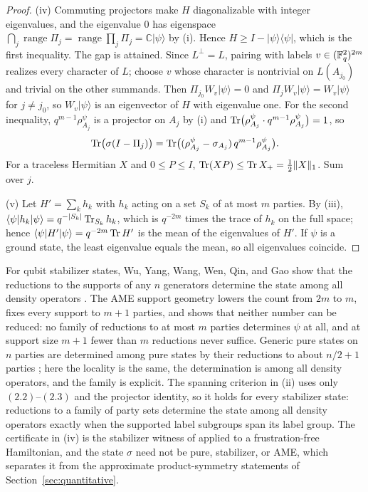 \begin{proof}
(iv) Commuting projectors make \(H\) diagonalizable with integer
eigenvalues, and the eigenvalue \(0\) has eigenspace
\(\bigcap_j\operatorname{range}\Pi_j=\operatorname{range}\prod_j\Pi_j
 =\mathbb C\lvert\psi\rangle\) by (i).  Hence
\(H\geq I-\lvert\psi\rangle\langle\psi\rvert\), which is the first
inequality.  The gap is attained.  Since \(L^\perp=L\), pairing with
labels \(v\in(\mathbb F_q^2)^{2m}\) realizes every character of \(L\); choose
\(v\) whose character is nontrivial on \(L(A_{j_0})\) and trivial on the
other summands.  Then \(\Pi_{j_0}W_v\lvert\psi\rangle=0\) and
\(\Pi_jW_v\lvert\psi\rangle=W_v\lvert\psi\rangle\) for \(j\neq j_0\), so
\(W_v\lvert\psi\rangle\) is an eigenvector of \(H\) with eigenvalue one.
For the second inequality, \(q^{m-1}\rho^\psi_{A_j}\) is a projector on
\(A_j\) by (i) and \(\operatorname{Tr}\bigl(\rho^\psi_{A_j}\cdot q^{m-1}\rho^\psi_{A_j}\bigr)=1\), so
\[
 \operatorname{Tr}\bigl(\sigma(I-\Pi_j)\bigr)
 =\operatorname{Tr}\bigl((\rho^\psi_{A_j}-\sigma_{A_j})\,q^{m-1}\rho^\psi_{A_j}\bigr).
\]
For a traceless Hermitian \(X\) and \(0\leq P\leq I\),
\(\operatorname{Tr}(XP)\leq\operatorname{Tr} X_+=\tfrac12\|X\|_1\).  Sum over \(j\).

(v) Let \(H'=\sum_kh_k\) with \(h_k\) acting on a set \(S_k\) of at most
\(m\) parties.  By (iii),
\(\langle\psi\rvert h_k\lvert\psi\rangle=q^{-|S_k|}\operatorname{Tr}_{S_k}h_k\), which
is \(q^{-2m}\) times the trace of \(h_k\) on the full space; hence
\(\langle\psi\rvert H'\lvert\psi\rangle=q^{-2m}\operatorname{Tr} H'\) is the mean of
the eigenvalues of \(H'\).  If \(\psi\) is a ground state, the least
eigenvalue equals the mean, so all eigenvalues coincide.
\end{proof}

For qubit stabilizer states, Wu, Yang, Wang, Wen, Qin, and Gao show that
the reductions to the supports of any \(n\) generators determine the state
among all density operators \cite[Theorem~2]{WuYangWangWenQin2015}.  The
AME support geometry lowers the count from \(2m\) to \(m\), fixes every
support to \(m+1\) parties, and shows that neither number can be reduced:
no family of reductions to at most \(m\) parties determines \(\psi\) at
all, and at support size \(m+1\) fewer than \(m\) reductions never
suffice.  Generic pure states on \(n\) parties are determined among pure
states by their reductions to about \(n/2+1\) parties
\cite{JonesLinden2005}; here the locality is the same, the determination
is among all density operators, and the family is explicit.  The spanning
criterion in (ii) uses only \((2.2)\)--\((2.3)\) and the projector
identity, so it holds for every stabilizer state: reductions to a family
of party sets determine the state among all density operators exactly
when the supported label subgroups span its label group.  The
certificate in (iv) is the stabilizer
witness of \cite{TothGuhne2005} applied to a frustration-free Hamiltonian,
and the state \(\sigma\) need not be pure, stabilizer, or AME, which
separates it from the approximate product-symmetry statements of
Section~\ref{sec:quantitative}.


